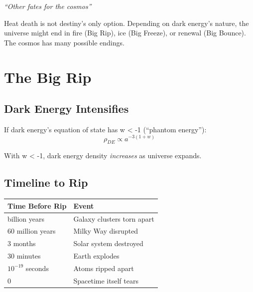 \documentclass[
  11pt,
  letterpaper,
  twoside,
  openright]{book}
\begin{document}
\emph{``Other fates for the cosmos''}

\begin{tcolorbox}[enhanced jigsaw, leftrule=.75mm, title=\textcolor{quarto-callout-note-color}{\faInfo}\hspace{0.5em}{Key Revelation}, bottomrule=.15mm, opacityback=0, coltitle=black, arc=.35mm, colframe=quarto-callout-note-color-frame, colbacktitle=quarto-callout-note-color!10!white, colback=white, titlerule=0mm, breakable, bottomtitle=1mm, toptitle=1mm, rightrule=.15mm, toprule=.15mm, left=2mm, opacitybacktitle=0.6]

Heat death is not destiny's only option. Depending on dark energy's
nature, the universe might end in fire (Big Rip), ice (Big Freeze), or
renewal (Big Bounce). The cosmos has many possible endings.

\end{tcolorbox}

\section{The Big Rip}\label{the-big-rip}

\subsection{Dark Energy Intensifies}\label{dark-energy-intensifies}

If dark energy's equation of state has w \textless{} -1 (``phantom
energy''): \[
\rho_{DE} \propto a^{-3(1+w)}
\]

With w \textless{} -1, dark energy density \emph{increases} as universe
expands.

\subsection{Timeline to Rip}\label{timeline-to-rip}

\begin{longtable}[]{@{}ll@{}}
\toprule\noalign{}
Time Before Rip & Event \\
\midrule\noalign{}
\endhead
\bottomrule\noalign{}
\endlastfoot
1 billion years & Galaxy clusters torn apart \\
60 million years & Milky Way disrupted \\
3 months & Solar system destroyed \\
30 minutes & Earth explodes \\
\(10^{-19}\) seconds & Atoms ripped apart \\
0 & Spacetime itself tears \\
\end{longtable}
\end{document}
